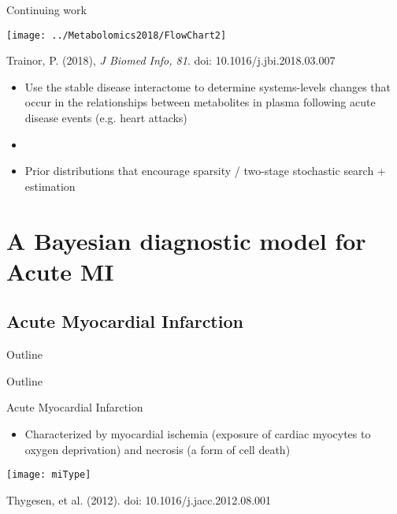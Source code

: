 \documentclass[xcolor=dvipsnames]{beamer}
\begin{document}
\begin{frame}{Continuing work}
	\vspace{-15pt}
	\begin{center}
		\texttt{[image: ../Metabolomics2018/FlowChart2]}
		
		Trainor, P. (2018), \emph{J Biomed Info, 81}. doi: 10.1016/j.jbi.2018.03.007 \pause
	\end{center}
	\begin{itemize}
		\item Use the stable disease interactome to determine systems-levels changes that occur in the relationships between metabolites in plasma following acute disease events (e.g. heart attacks) \pause
		\item[]
		\item Prior distributions that encourage sparsity / two-stage stochastic search + estimation 
	\end{itemize}
\end{frame}

\section{A Bayesian diagnostic model for Acute MI}
\subsection{Acute Myocardial Infarction}
\begin{frame}{Outline}
\vspace{-10.5pt}
\tableofcontents[currentsection,subsectionstyle=hide]
\end{frame}

\begin{frame}{Outline}
\vspace{-10.5pt}
\tableofcontents[currentsection,subsectionstyle=show/shaded/hide]
\end{frame}

\begin{frame}{Acute Myocardial Infarction}
\vspace{-5pt}
\begin{itemize}
\item Characterized by myocardial ischemia (exposure of cardiac myocytes to oxygen deprivation) and necrosis (a form of cell death)
\end{itemize}
\begin{center}
\texttt{[image: miType]}

Thygesen, et al. (2012). doi: 10.1016/j.jacc.2012.08.001
\end{center}
\end{frame}
\end{document}
